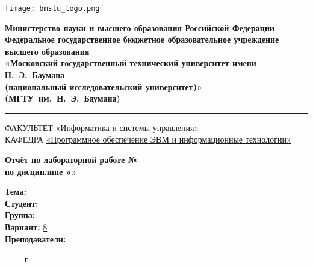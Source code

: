 \thispagestyle{empty}

\begin{titlepage}
	\noindent \begin{minipage}{0.1\textwidth}
	\texttt{[image: bmstu\_logo.png]}
	\end{minipage}
	\noindent\begin{minipage}{0.9\textwidth}\centering
		\textbf{Министерство науки и высшего образования Российской Федерации}\\
		\textbf{Федеральное государственное бюджетное образовательное учреждение высшего образования}\\
		\textbf{«Московский государственный технический университет имени Н.~Э.~Баумана}\\
		\textbf{(национальный исследовательский университет)»}\\
		\textbf{(МГТУ~им.~Н.~Э.~Баумана)}
	\end{minipage}
	
	\vspace{7pt}
	
	\noindent\rule{\textwidth}{2pt}
	
	\vspace{7pt}
	
	\noindent ФАКУЛЬТЕТ \underline{«Информатика и системы управления»} \\
	\noindent КАФЕДРА \underline{«Программное обеспечение ЭВМ и информационные технологии»}
	
	\vspace{2.5cm}
	
	\begin{center}
		\Large\textbf{Отчёт по лабораторной работе №\labNumber} \\
		\Large\textbf{по дисциплине «\subjectName»} \\
	\end{center}
	
	\vspace{2.5cm}
	
	\noindent\textbf{Тема:} \underline{\labTheme} \\
	\noindent\textbf{Студент:} \underline{\student} \\
	\noindent\textbf{Группа:} \underline{\group} \\
	\noindent\textbf{Вариант:} \underline{8}\\
	\noindent\textbf{Преподаватели:} \underline{\teachers}\\
	
	\vspace*{\fill}
	
	\begin{center}
	\city~--- \the\year{}~г.	
	\end{center}

\end{titlepage}

\newpage


